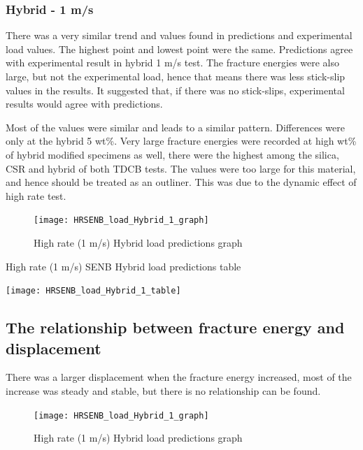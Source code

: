 \documentclass[numbers=noendperiod,chapterprefix=on]{icldt} %
\begin{document}
{\subsubsection{Hybrid - 1 m/s}
There was a very similar trend and values found in predictions and experimental load values. The highest point and lowest point were the same. Predictions agree with experimental result in hybrid 1  m/s test. The fracture energies were also large, but not the experimental load, hence that means there was less stick-slip values in the results. It suggested that, if there was no stick-slips, experimental results would agree with predictions.

Most of the values were similar and leads to a similar pattern. Differences were only at the hybrid 5 wt\%.
Very large fracture energies were recorded at high wt\% of hybrid modified specimens as well, there were the highest among the silica, CSR and hybrid of both TDCB tests. The values were too large for this material, and hence should be treated as an outliner. This was due to the dynamic effect of high rate test.

\begin{figure}[!hp]
    \centering
    \texttt{[image: HRSENB\_load\_Hybrid\_1\_graph]}\label{HRSENB_load_Hybrid_1_graph}
    \caption{High rate (1 m/s) Hybrid load predictions graph}
    \end{figure}
   \FloatBarrier
   
   \begin{table}
      \centering
      \caption{High rate (1 m/s) SENB Hybrid load predictions table}\label{HRSENB_load_Hybrid_1_table}
      \texttt{[image: HRSENB\_load\_Hybrid\_1\_table]}
      \end{table}
      \FloatBarrier      

\subsection{The relationship between fracture energy and displacement}       
There was a larger displacement when the fracture energy increased, most of the increase was steady and stable, but there is no relationship can be found. 
   
\begin{figure}[!hp]
    \centering
    \texttt{[image: HRSENB\_load\_Hybrid\_1\_graph]}\label{HRSENB_load_Hybrid_1_graph}
    \caption{High rate (1 m/s) Hybrid load predictions graph}
    \end{figure}
   \FloatBarrier
   
}
\end{document}
